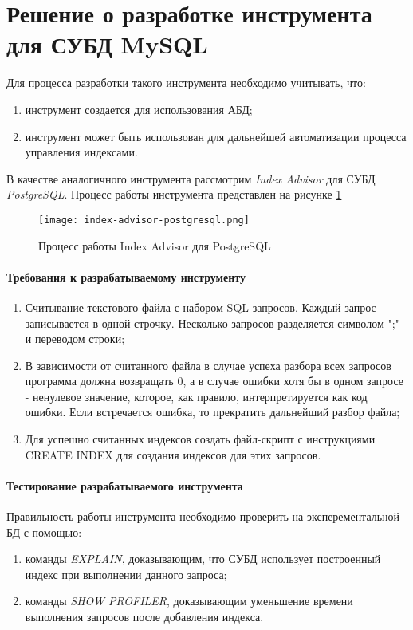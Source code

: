 \section{Решение о разработке инструмента для СУБД MySQL}

Для процесса разработки такого инструмента необходимо учитывать, что:
\begin{enumerate}
\item инструмент создается для использования АБД;
\item инструмент может быть использован для дальнейшей автоматизации процесса управления индексами.
\end{enumerate}

В качестве аналогичного инструмента рассмотрим \textit{Index Advisor} для СУБД \textit{PostgreSQL}. Процесс работы инструмента представлен на рисунке \ref{img:index_advisor_postgresql}

\begin{figure}[H]
  \centering
  \texttt{[image: index-advisor-postgresql.png]}
  \caption{Процесс работы Index Advisor для PostgreSQL}
  \label{img:index_advisor_postgresql}
\end{figure}

\paragraph{Требования к разрабатываемому инструменту}
\begin{enumerate}
\item Считывание текстового файла с набором SQL запросов. Каждый запрос записывается в одной строчку. Несколько запросов разделяется символом ";" и переводом строки;
\item В зависимости от считанного файла в случае успеха разбора всех запросов программа должна возвращать 0, а в случае ошибки хотя бы в одном запросе - ненулевое значение, которое, как правило, интерпретируется как код ошибки. Если встречается ошибка, то прекратить дальнейший разбор файла;
\item Для успешно считанных индексов создать файл-скрипт с инструкциями CREATE INDEX для создания индексов для этих запросов.
\end{enumerate}

\paragraph{Тестирование разрабатываемого инструмента} 

Правильность работы инструмента необходимо проверить на эксперементальной БД с помощью:
\begin{enumerate}
\item команды \textit{EXPLAIN}, доказывающим, что СУБД использует построенный индекс при выполнении данного запроса;
\item команды \textit{SHOW PROFILER}, доказывающим уменьшение времени выполнения запросов после добавления индекса.
\end{enumerate}
